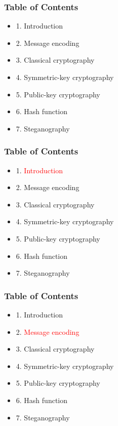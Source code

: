 \documentclass[handout, xcolor=dvipsnames,aspectratio=169]{beamer}
\begin{document}
\begin{frame}
  \centering
  \frametitle{Table of Contents}
  \begin{itemize}
    \item 1. Introduction
    \item 2. Message encoding
    \item 3. Classical cryptography
    \item 4. Symmetric-key cryptography
    \item 5. Public-key cryptography
    \item 6. Hash function
    \item 7. Steganography
  \end{itemize}  
\end{frame}
\begin{frame}
  \centering
  \frametitle{Table of Contents}
  \begin{itemize}
    \item 1. \textcolor{red}{Introduction}
    \item 2. Message encoding
    \item 3. Classical cryptography
    \item 4. Symmetric-key cryptography
    \item 5. Public-key cryptography
    \item 6. Hash function
    \item 7. Steganography
  \end{itemize}  
\end{frame}

\begin{frame}
  \centering
  \frametitle{Table of Contents}
  \begin{itemize}
    \item 1. Introduction
    \item 2. \textcolor{red}{Message encoding}
    \item 3. Classical cryptography
    \item 4. Symmetric-key cryptography
    \item 5. Public-key cryptography
    \item 6. Hash function
    \item 7. Steganography
  \end{itemize}  
\end{frame}

\end{document}
